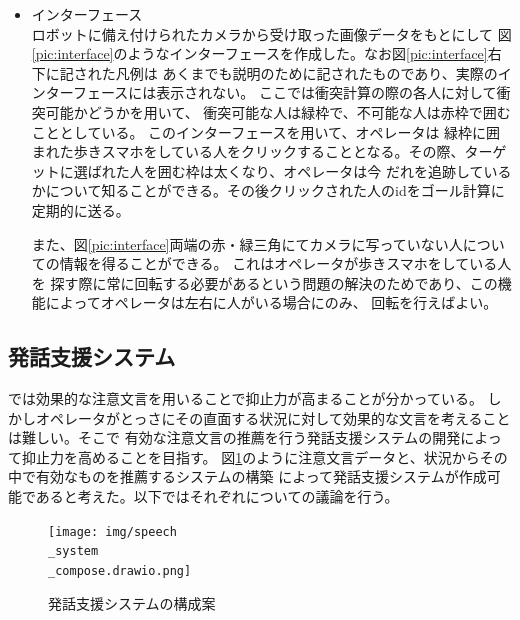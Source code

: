 \documentclass{kuisthesis}
\begin{document}
\begin{itemize}
  \item インターフェース \\
  \quad ロボットに備え付けられたカメラから受け取った画像データをもとにして
  図\ref{pic:interface}のようなインターフェースを作成した。なお図\ref{pic:interface}右下に記された凡例は
  あくまでも説明のために記されたものであり、実際のインターフェースには表示されない。
  ここでは衝突計算の際の各人に対して衝突可能かどうかを用いて、
  衝突可能な人は緑枠で、不可能な人は赤枠で囲むこととしている。
  このインターフェースを用いて、オペレータは
  緑枠に囲まれた歩きスマホをしている人をクリックすることとなる。その際、ターゲットに選ばれた人を囲む枠は太くなり、オペレータは今
  だれを追跡しているかについて知ることができる。その後クリックされた人のidをゴール計算に定期的に送る。
  
  \quad また、図\ref{pic:interface}両端の赤・緑三角にてカメラに写っていない人についての情報を得ることができる。
  これはオペレータが歩きスマホをしている人を
  探す際に常に回転する必要があるという問題の解決のためであり、この機能によってオペレータは左右に人がいる場合にのみ、
  回転を行えばよい。
  
\end{itemize}
\vspace{5mm}







\subsection{発話支援システム}


\cite{Schneider2022}では効果的な注意文言を用いることで抑止力が高まることが分かっている。
しかしオペレータがとっさにその直面する状況に対して効果的な文言を考えることは難しい。そこで
有効な注意文言の推薦を行う発話支援システムの開発によって抑止力を高めることを目指す。
図\ref{pic:speechcompose}のように注意文言データと、状況からその中で有効なものを推薦するシステムの構築
によって発話支援システムが作成可能であると考えた。以下ではそれぞれについての議論を行う。
\begin{figure}[htb]
  \centering
  \texttt{[image: img/speech\\\_system\\\_compose.drawio.png]}
  \caption{発話支援システムの構成案}
  \label{pic:speechcompose}
\end{figure}
\end{document}
